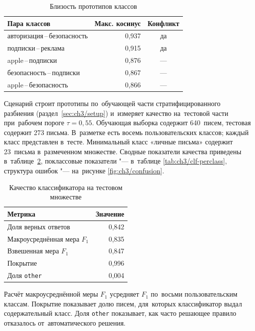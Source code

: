 \begin{table}[htbp]
    \centering
    \caption{Близость прототипов классов}\label{tab:ch3/conflicts}
    \begin{tabular}{@{}lrc@{}}
        \toprule
        Пара классов & Макс. косинус & Конфликт \\
        \midrule
        авторизация\,--\,безопасность & 0{,}937 & да  \\
        подписки\,--\,реклама         & 0{,}915 & да  \\
        apple\,--\,подписки           & 0{,}876 & --- \\
        безопасность\,--\,подписки    & 0{,}867 & --- \\
        apple\,--\,безопасность       & 0{,}866 & --- \\
        \bottomrule
    \end{tabular}
\end{table}
\FloatBarrier

Сценарий строит прототипы по~обучающей части стратифицированного разбиения
(раздел~\ref{sec:ch3/setup}) и~измеряет качество на~тестовой части при~рабочем
пороге \(\tau=0{,}55\). Обучающая выборка содержит 640~писем, тестовая содержит
273 письма. В~разметке есть восемь пользовательских классов; каждый класс
представлен в~тесте. Минимальный класс «личные письма» содержит 23~письма
в~размеченном множестве. Сводные показатели качества приведены
в~таблице~\ref{tab:ch3/clf-overall}, поклассовые показатели "--- в~таблице
\ref{tab:ch3/clf-perclass}, структура ошибок "--- на~рисунке
\ref{fig:ch3/confusion}.

\begin{table}[htbp]
    \centering
    \caption{Качество классификатора на тестовом множестве}\label{tab:ch3/clf-overall}
    \begin{tabular}{@{}lr@{}}
        \toprule
        Метрика & Значение \\
        \midrule
        Доля верных ответов & 0{,}842 \\
        Макроусреднённая мера \(F_1\) & 0{,}835 \\
        Взвешенная мера \(F_1\) & 0{,}847 \\
        Покрытие & 0{,}996 \\
        Доля \texttt{other} & 0{,}004 \\
        \bottomrule
    \end{tabular}
\end{table}
\FloatBarrier

Расчёт макроусреднённой меры \(F_1\) усредняет \(F_1\) по~восьми
пользовательским классам. Покрытие показывает долю писем, для~которых
классификатор выдал содержательный класс. Доля \texttt{other} показывает,
как часто решающее правило отказалось от~автоматического решения.

